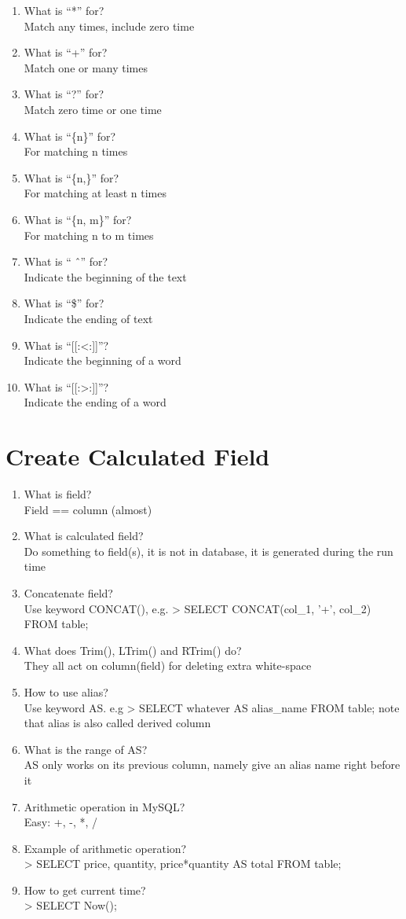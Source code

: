 \documentclass[10pt,a4paper,oneside]{article}
\begin{document}
\begin{enumerate}[1.]
\item  What is ``*'' for?  \\
Match any times, include zero time
\item   What is ``+'' for? \\
Match one or many times
\item   What is ``?'' for? \\
Match zero time or one time
\item   What is ``\{n\}'' for? \\
For matching n times
\item  What is ``\{n,\}'' for?  \\
For matching at least n times
\item What is ``\{n, m\}'' for?   \\
For matching n to m times
\item What is `` \^\ '' for?   \\
Indicate the beginning of the text
\item  What is ``\$'' for?  \\
Indicate the ending of text
\item  What is ``[[:<:]]''?  \\
Indicate the beginning of a word
\item   What is ``[[:>:]]''? \\
Indicate the ending of a word
\end{enumerate}
\section{Create Calculated Field}
\begin{enumerate}[1.]
\item  What is field?  \\
Field == column (almost)
\item What is calculated field?   \\
Do something to field(s), it is not in database, it is generated during the run time
\item Concatenate field?   \\
Use keyword CONCAT(), e.g. > SELECT CONCAT(col\_1, ’+’, col\_2) FROM table;
\item  What does Trim(), LTrim() and RTrim() do?  \\
They all act on column(field) for deleting extra white-space
\item  How to use alias?  \\
Use keyword AS. e.g > SELECT whatever AS alias\_name FROM table; note that alias is also called derived column
\item What is the range of AS?   \\
AS only works on its previous column, namely give an alias name right before it
\item  Arithmetic operation in MySQL?  \\
Easy: +, -, *, /
\item  Example of arithmetic operation?  \\
> SELECT price, quantity, price*quantity AS total FROM table; 
\item   How to get current time? \\
> SELECT Now();
\end{enumerate}
\end{document}
